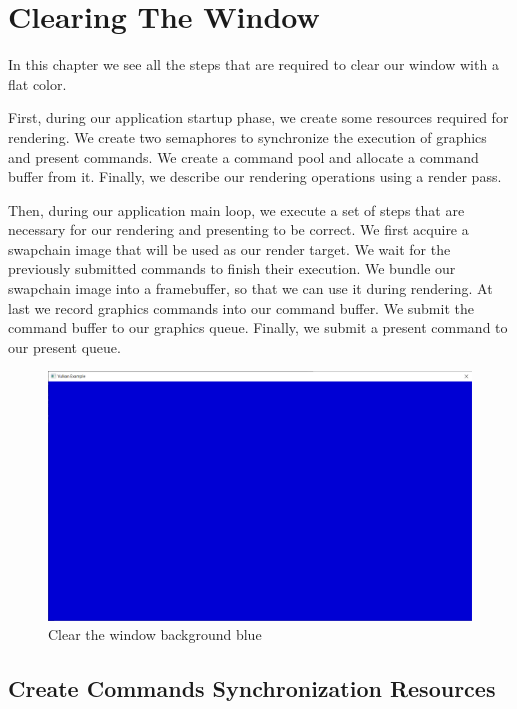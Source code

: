 \chapter{Clearing The Window}
\label{chap:ClearWindow}

In this chapter we see all the steps that are required to clear our
window with a flat color.

First, during our application startup phase, we create some resources
required for rendering.
We create two semaphores to synchronize the execution of graphics and present
commands.
We create a command pool and allocate a command buffer from it.
Finally, we describe our rendering operations using a render pass.

Then, during our application main loop, we execute a set of steps
that are necessary for our rendering and presenting to be correct.
We first acquire a swapchain image that will be used as our render target.
We wait for the previously submitted commands to finish their execution.
We bundle our swapchain image into a framebuffer, so that we can use it
during rendering.
At last we record graphics commands into our command buffer.
We submit the command buffer to our graphics queue.
Finally, we submit a present command to our present queue.

\begin{figure}[ht]
    \centering
    \includegraphics[scale=0.20]{images/ChClearWindow/ClearWindow.png}
    \caption{Clear the window background blue}
    \label{fig::ClearWindow}
\end{figure}

\section{Create Commands Synchronization Resources}

